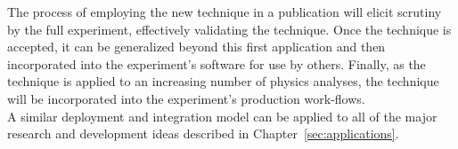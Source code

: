 The process of employing the new technique in a publication will elicit scrutiny by the full experiment, effectively validating the technique. Once the technique is accepted, it can be generalized beyond this first application and then incorporated into the experiment's software for use by others. Finally, as the technique is applied to an increasing number of physics analyses, the technique will be incorporated into the experiment's production work-flows.\\

A similar deployment and integration model can be applied to all of the major research and development ideas described in Chapter~\ref{sec:applications}.

